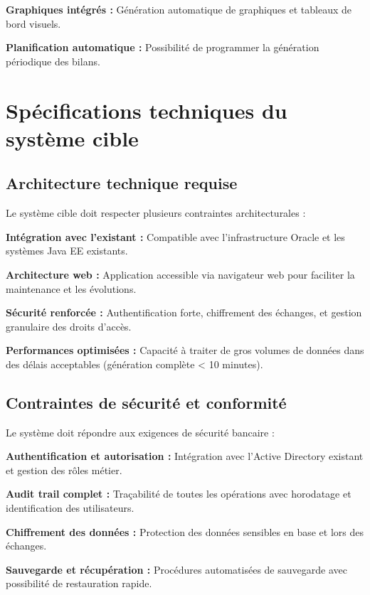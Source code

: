 \textbf{Graphiques intégrés :} Génération automatique de graphiques et tableaux de bord visuels.

\textbf{Planification automatique :} Possibilité de programmer la génération périodique des bilans.

\section{Spécifications techniques du système cible}

\subsection{Architecture technique requise}

Le système cible doit respecter plusieurs contraintes architecturales :

\medskip

\textbf{Intégration avec l'existant :} Compatible avec l'infrastructure Oracle et les systèmes Java EE existants.

\textbf{Architecture web :} Application accessible via navigateur web pour faciliter la maintenance et les évolutions.

\textbf{Sécurité renforcée :} Authentification forte, chiffrement des échanges, et gestion granulaire des droits d'accès.

\textbf{Performances optimisées :} Capacité à traiter de gros volumes de données dans des délais acceptables (génération complète < 10 minutes).

\subsection{Contraintes de sécurité et conformité}

Le système doit répondre aux exigences de sécurité bancaire :

\medskip

\textbf{Authentification et autorisation :} Intégration avec l'Active Directory existant et gestion des rôles métier.

\textbf{Audit trail complet :} Traçabilité de toutes les opérations avec horodatage et identification des utilisateurs.

\textbf{Chiffrement des données :} Protection des données sensibles en base et lors des échanges.

\textbf{Sauvegarde et récupération :} Procédures automatisées de sauvegarde avec possibilité de restauration rapide.

